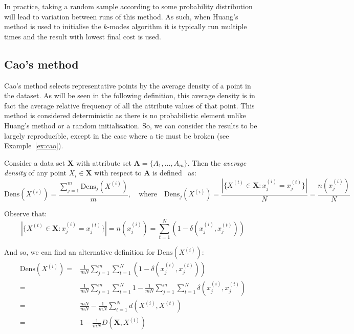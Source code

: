 In practice, taking a random sample according to some probability distribution
will lead to variation between runs of this method. As such, when Huang's method
is used to initialise the \(k\)-modes algorithm it is typically run multiple
times and the result with lowest final cost is used.

%

\subsection{Cao's method}\label{subsec:cao}

Cao's method selects representative points by the average density of a point in
the dataset. As will be seen in the following definition, this average density 
is in fact the average relative frequency of all the attribute values of that 
point. This method is considered deterministic as there is no probabilistic
element \- unlike Huang's method or a random initialisation. So, we can consider
the results to be largely reproducible, except in the case where a tie must be
broken (see Example~\ref{ex:cao}).

\begin{definition}\label{def:density}	
    Consider a data set \(\textbf{X}\) with attribute set \(\textbf{A} = 
    \{A_1, \ldots, A_m\}\). Then the \emph{average density} of any point 
    \(X_i \in \textbf{X}\) with respect to \(\textbf{A}\) is 
    defined~\cite{Cao2009} as:
	\[
	    \text{Dens}(X^{(i)}) = \frac{\sum_{j=1}^m \text{Dens}_{j}(X^{(i)})}{m}, 
        \quad \text{where} \quad \text{Dens}_{j}(X^{(i)}) = \frac{|\{X^{(t)} \in 
        \textbf{X} : x_j^{(i)} = x_j^{(t)}\}|}{N} = \frac{n(x_j^{(i)})}{N}
	\]

    Observe that:
    \[
	    |\{X^{(t)} \in \textbf{X} : x_j^{(i)} = x_j^{(t)}\}| = n(x_j^{(i)}) = 
	    \sum_{t=1}^N (1 - \delta(x_j^{(i)}, x_j^{(t)}))
    \]

    And so, we can find an alternative definition for \(\text{Dens}(X^{(i)})\):
    \begin{equation}\label{eq:alt-def}
    \begin{aligned}
        \text{Dens}(X^{(i)}) = {} & {} \frac{1}{mN} \sum_{j=1}^m \sum_{t=1}^N (1
        - \delta(x_j^{(i)}, x_j^{(t)}))
        \\
        = {} & {} \frac{1}{mN} \sum_{j=1}^m \sum_{t=1}^N 1 - \frac{1}{mN}
        \sum_{j=1}^m \sum_{t=1}^N \delta(x_j^{(i)}, x_j^{(t)})
        \\
        = {} & {} \frac{mN}{mN} - \frac{1}{mN} \sum_{t=1}^N d(X^{(i)}, X^{(t)})
        \\
        = {} & {} 1 - \frac{1}{mN} D(\textbf{X}, X^{(i)})
    \end{aligned}
    \end{equation}
\end{definition}

